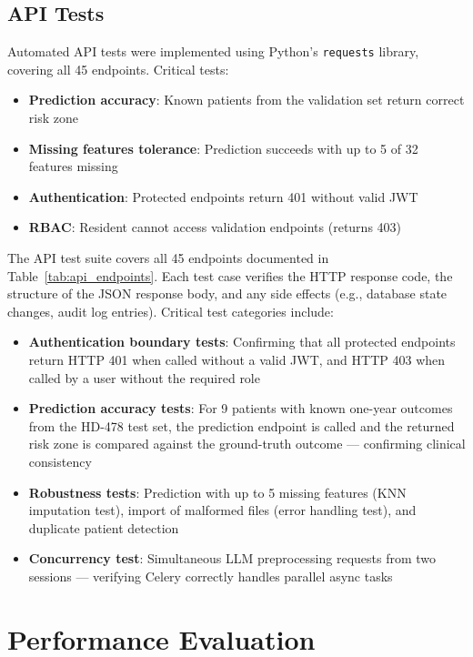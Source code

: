 \documentclass[12pt,a4paper,twoside]{report}
\begin{document}
\subsection{API Tests}

Automated API tests were implemented using Python's \texttt{requests} library, covering all 45 endpoints. Critical tests:
\begin{itemize}
  \item \textbf{Prediction accuracy}: Known patients from the validation set return correct risk zone
  \item \textbf{Missing features tolerance}: Prediction succeeds with up to 5 of 32 features missing
  \item \textbf{Authentication}: Protected endpoints return 401 without valid JWT
  \item \textbf{RBAC}: Resident cannot access validation endpoints (returns 403)
\end{itemize}

The API test suite covers all 45 endpoints documented in Table~\ref{tab:api_endpoints}. Each test case verifies the HTTP response code, the structure of the JSON response body, and any side effects (e.g., database state changes, audit log entries). Critical test categories include:

\begin{itemize}
  \item \textbf{Authentication boundary tests}: Confirming that all protected endpoints return HTTP 401 when called without a valid JWT, and HTTP 403 when called by a user without the required role
  \item \textbf{Prediction accuracy tests}: For 9 patients with known one-year outcomes from the HD-478 test set, the prediction endpoint is called and the returned risk zone is compared against the ground-truth outcome --- confirming clinical consistency
  \item \textbf{Robustness tests}: Prediction with up to 5 missing features (KNN imputation test), import of malformed files (error handling test), and duplicate patient detection
  \item \textbf{Concurrency test}: Simultaneous LLM preprocessing requests from two sessions --- verifying Celery correctly handles parallel async tasks
\end{itemize}

\section{Performance Evaluation}\label{sec:perf}
\end{document}
